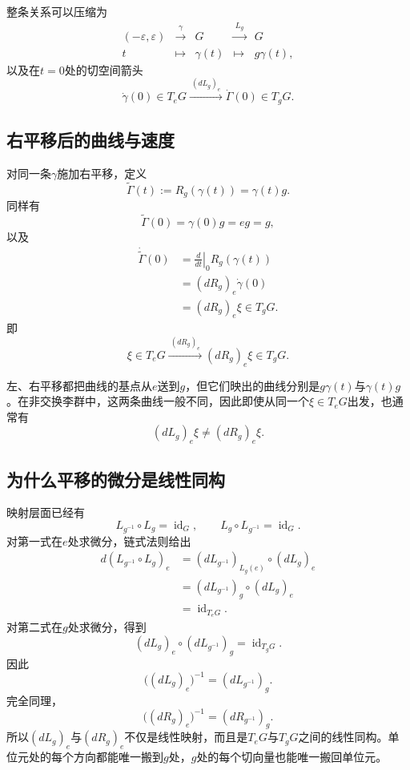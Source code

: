 整条关系可以压缩为
\[
\begin{array}{ccccc}
(-\varepsilon,\varepsilon)
&\xrightarrow{\ \gamma\ }&
G
&\xrightarrow{\ L_g\ }&
G\\
t&\longmapsto&\gamma(t)&\longmapsto&g\gamma(t),
\end{array}
\]
以及在$t=0$处的切空间箭头
\[
    \dot\gamma(0)\in T_eG
    \xrightarrow{\ (dL_g)_e\ }
    \dot\Gamma(0)\in T_gG.
\]

\subsection{右平移后的曲线与速度}

对同一条$\gamma$施加右平移，定义
\[
    \widetilde\Gamma(t)
    :=R_g(\gamma(t))
    =\gamma(t)g.
\]
同样有
\[
    \widetilde\Gamma(0)=\gamma(0)g=eg=g,
\]
以及
\[
\begin{aligned}
    \dot{\widetilde\Gamma}(0)
    &=\left.\frac{d}{dt}\right|_0R_g(\gamma(t))\\
    &=(dR_g)_e\dot\gamma(0)\\
    &=(dR_g)_e\xi\in T_gG.
\end{aligned}
\]
即
\[
    \boxed{
    \xi\in T_eG
    \xrightarrow{\ (dR_g)_e\ }
    (dR_g)_e\xi\in T_gG.
    }
\]

左、右平移都把曲线的基点从$e$送到$g$，但它们映出的曲线分别是$g\gamma(t)$与$\gamma(t)g$。在非交换李群中，这两条曲线一般不同，因此即使从同一个$\xi\in T_eG$出发，也通常有
\[
    (dL_g)_e\xi
    \neq
    (dR_g)_e\xi.
\]

\subsection{为什么平移的微分是线性同构}

映射层面已经有
\[
    L_{g^{-1}}\circ L_g=\operatorname{id}_G,
    \qquad
    L_g\circ L_{g^{-1}}=\operatorname{id}_G.
\]
对第一式在$e$处求微分，链式法则给出
\[
\begin{aligned}
    d(L_{g^{-1}}\circ L_g)_e
    &=(dL_{g^{-1}})_{L_g(e)}\circ(dL_g)_e\\
    &=(dL_{g^{-1}})_g\circ(dL_g)_e\\
    &=\operatorname{id}_{T_eG}.
\end{aligned}
\]
对第二式在$g$处求微分，得到
\[
    (dL_g)_e\circ(dL_{g^{-1}})_g
    =\operatorname{id}_{T_gG}.
\]
因此
\[
    \boxed{
    \bigl((dL_g)_e\bigr)^{-1}
    =(dL_{g^{-1}})_g.
    }
\]
完全同理，
\[
    \boxed{
    \bigl((dR_g)_e\bigr)^{-1}
    =(dR_{g^{-1}})_g.
    }
\]
所以$(dL_g)_e$与$(dR_g)_e$不仅是线性映射，而且是$T_eG$与$T_gG$之间的线性同构。单位元处的每个方向都能唯一搬到$g$处，$g$处的每个切向量也能唯一搬回单位元。

